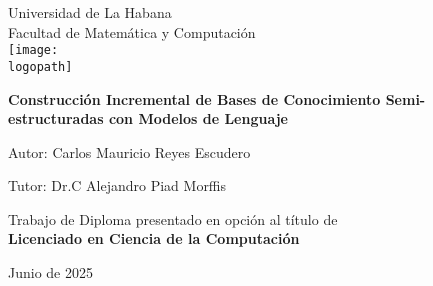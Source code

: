 \newcommand{\logopath}{figures/uhlogo.pdf} %
\newcommand{\thetitletext}{Construcción Incremental de Bases de Conocimiento Semi-estructuradas con Modelos de Lenguaje}
\newcommand{\theauthortext}{Carlos Mauricio Reyes Escudero}
\newcommand{\theadvisortext}{Dr.C Alejandro Piad Morffis}
\newcommand{\thedate}{Junio de 2025}
\newcommand{\theuniversitytext}{Universidad de La Habana}
\newcommand{\thefacultytext}{Facultad de Matemática y Computación}
\newcommand{\thedegreetext}{Trabajo de Diploma presentado en opción al título de \\ \textbf{Licenciado en Ciencia de la Computación}}

\begin{titlingpage}
\centering %

{\large \theuniversitytext} \\
{\large \thefacultytext} \\ %
\vspace{0.5cm} %
\texttt{[image: \\logopath]} %

\vspace{2cm} %

{\LARGE \bfseries \thetitletext \par} %
\vspace{2cm} %

{\Large Autor: \theauthortext \par} %
\vspace{0.5cm} %
{\Large Tutor: \theadvisortext \par} %


\vfill

{\large \thedegreetext \par} %
\vspace{1cm} %

{\large \thedate \par}
\vspace{1cm} %
\end{titlingpage}